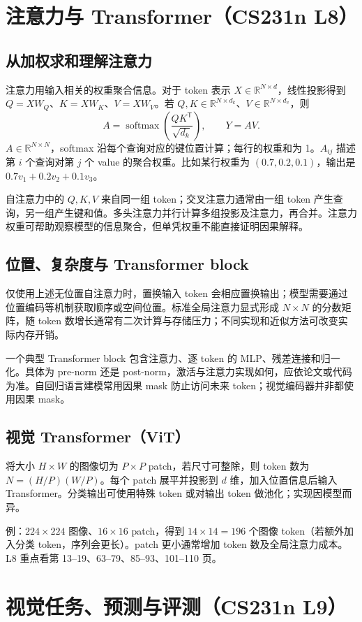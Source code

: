 \documentclass[11pt,a4paper,fontset=none]{ctexart}
\newcommand{\R}{\mathbb{R}}
\begin{document}
\section{注意力与 Transformer（CS231n L8）}
\subsection{从加权求和理解注意力}
注意力用输入相关的权重聚合信息。对于 token 表示 $X\in\R^{N\times d}$，线性投影得到 $Q=XW_Q$、$K=XW_K$、$V=XW_V$。若 $Q,K\in\R^{N\times d_k}$、$V\in\R^{N\times d_v}$，则
\[
A=\operatorname{softmax}\left(\frac{QK^{\mathsf T}}{\sqrt{d_k}}\right),\qquad Y=AV.
\]
$A\in\R^{N\times N}$，softmax 沿每个查询对应的键位置计算；每行的权重和为 1。$A_{ij}$ 描述第 $i$ 个查询对第 $j$ 个 value 的聚合权重。比如某行权重为 $(0.7,0.2,0.1)$，输出是 $0.7v_1+0.2v_2+0.1v_3$。

自注意力中的 $Q,K,V$ 来自同一组 token；交叉注意力通常由一组 token 产生查询，另一组产生键和值。多头注意力并行计算多组投影及注意力，再合并。注意力权重可帮助观察模型的信息聚合，但单凭权重不能直接证明因果解释。
\subsection{位置、复杂度与 Transformer block}
仅使用上述无位置自注意力时，置换输入 token 会相应置换输出；模型需要通过位置编码等机制获取顺序或空间位置。标准全局注意力显式形成 $N\times N$ 的分数矩阵，随 token 数增长通常有二次计算与存储压力；不同实现和近似方法可改变实际内存开销。

一个典型 Transformer block 包含注意力、逐 token 的 MLP、残差连接和归一化。具体为 pre-norm 还是 post-norm，激活与注意力实现如何，应依论文或代码为准。自回归语言建模常用因果 mask 防止访问未来 token；视觉编码器并非都使用因果 mask。
\subsection{视觉 Transformer（ViT）}
将大小 $H\times W$ 的图像切为 $P\times P$ patch，若尺寸可整除，则 token 数为 $N=(H/P)(W/P)$。每个 patch 展平并投影到 $d$ 维，加入位置信息后输入 Transformer。分类输出可使用特殊 token 或对输出 token 做池化；实现因模型而异。

例：$224\times224$ 图像、$16\times16$ patch，得到 $14\times14=196$ 个图像 token（若额外加入分类 token，序列会更长）。patch 更小通常增加 token 数及全局注意力成本。L8 重点看第 13--19、63--79、85--93、101--110 页。
\section{视觉任务、预测与评测（CS231n L9）}
\end{document}
